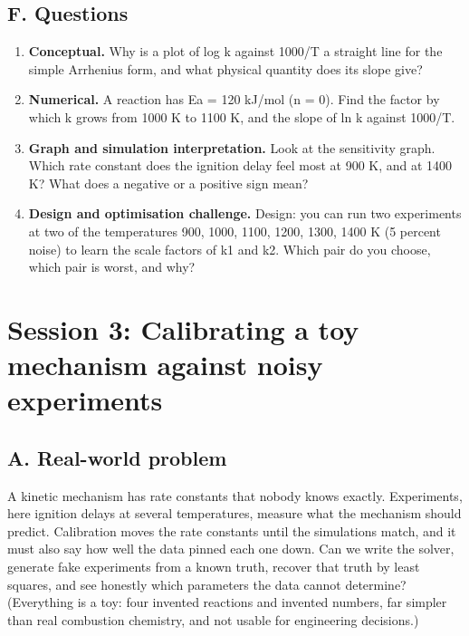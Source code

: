 \documentclass[11pt,a4paper]{article}
\begin{document}
\subsection*{F. Questions}
\begin{enumerate}[nosep]
\item \textbf{Conceptual.} Why is a plot of log k against 1000/T a straight line for the simple Arrhenius form, and what physical quantity does its slope give?
\item \textbf{Numerical.} A reaction has Ea = 120 kJ/mol (n = 0). Find the factor by which k grows from 1000 K to 1100 K, and the slope of ln k against 1000/T.
\item \textbf{Graph and simulation interpretation.} Look at the sensitivity graph. Which rate constant does the ignition delay feel most at 900 K, and at 1400 K? What does a negative or a positive sign mean?
\item \textbf{Design and optimisation challenge.} Design: you can run two experiments at two of the temperatures 900, 1000, 1100, 1200, 1300, 1400 K (5 percent noise) to learn the scale factors of k1 and k2. Which pair do you choose, which pair is worst, and why?
\end{enumerate}

\section{Session 3: Calibrating a toy mechanism against noisy experiments}

\subsection*{A. Real-world problem}
A kinetic mechanism has rate constants that nobody knows exactly. Experiments, here ignition delays at several temperatures, measure what the mechanism should predict. Calibration moves the rate constants until the simulations match, and it must also say how well the data pinned each one down. Can we write the solver, generate fake experiments from a known truth, recover that truth by least squares, and see honestly which parameters the data cannot determine? (Everything is a toy: four invented reactions and invented numbers, far simpler than real combustion chemistry, and not usable for engineering decisions.)
\end{document}
